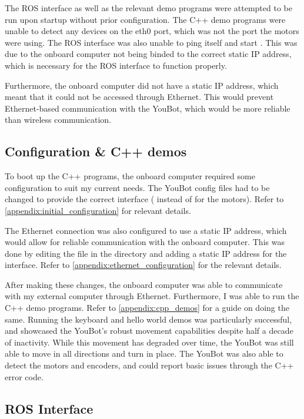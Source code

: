 \documentclass[a4paper, 12pt]{article}
\newcommand{\code}[1]{\texttt{\detokenize{#1}}}
\begin{document}
    The ROS interface as well as the relevant demo programs were attempted to be run upon startup without prior configuration. The C++ demo programs were unable to detect any devices on the eth0 port, which was not the port the motors were using. The ROS interface was also unable to ping itself and start \code{roscore}. This was due to the onboard computer not being binded to the correct static IP address, which is necessary for the ROS interface to function properly.

    Furthermore, the onboard computer did not have a static IP address, which meant that it could not be accessed through Ethernet. This would prevent Ethernet-based communication with the YouBot, which would be more reliable than wireless communication. 

    \subsection{Configuration \& C++ demos}

    To boot up the C++ programs, the onboard computer required some configuration to suit my current needs. The YouBot config files had to be changed to provide the correct interface (\code{eth1} instead of \code{eth0} for the motors). Refer to \ref{appendix:initial_configuration} for relevant details. 

    The Ethernet connection was also configured to use a static IP address, which would allow for reliable communication with the onboard computer. This was done by editing the \code{interfaces} file in the \code{/etc/network/} directory and adding a static IP address for the \code{eth0} interface. Refer to \ref{appendix:ethernet_configuration} for the relevant details.

    After making these changes, the onboard computer was able to communicate with my external computer through Ethernet. Furthermore, I was able to run the C++ demo programs. Refer to \ref{appendix:cpp_demos} for a guide on doing the same. Running the keyboard and hello world demos was particularly successful, and showcased the YouBot's robust movement capabilities despite half a decade of inactivity. While this movement has degraded over time, the YouBot was still able to move in all directions and turn in place. The YouBot was also able to detect the motors and encoders, and could report basic issues through the C++ error code. 

    \subsection{ROS Interface}
\end{document}
